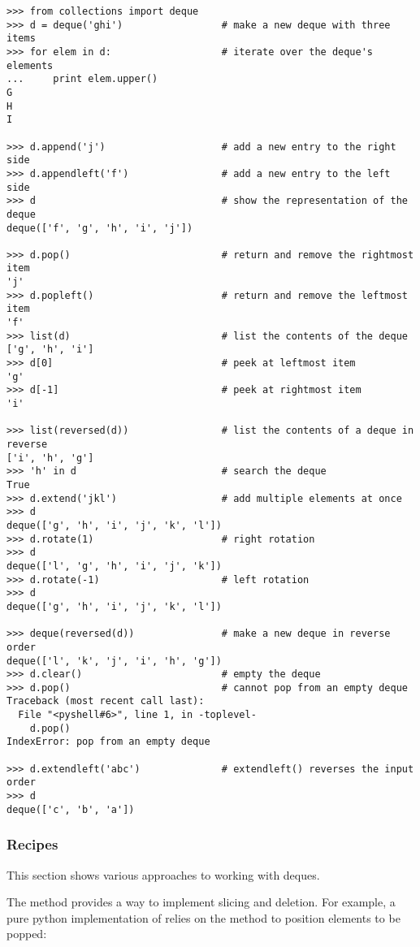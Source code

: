 \begin{verbatim}
>>> from collections import deque
>>> d = deque('ghi')                 # make a new deque with three items
>>> for elem in d:                   # iterate over the deque's elements
...     print elem.upper()	
G
H
I

>>> d.append('j')                    # add a new entry to the right side
>>> d.appendleft('f')                # add a new entry to the left side
>>> d                                # show the representation of the deque
deque(['f', 'g', 'h', 'i', 'j'])

>>> d.pop()                          # return and remove the rightmost item
'j'
>>> d.popleft()                      # return and remove the leftmost item
'f'
>>> list(d)                          # list the contents of the deque
['g', 'h', 'i']
>>> d[0]                             # peek at leftmost item
'g'
>>> d[-1]                            # peek at rightmost item
'i'

>>> list(reversed(d))                # list the contents of a deque in reverse
['i', 'h', 'g']
>>> 'h' in d                         # search the deque
True
>>> d.extend('jkl')                  # add multiple elements at once
>>> d
deque(['g', 'h', 'i', 'j', 'k', 'l'])
>>> d.rotate(1)                      # right rotation
>>> d
deque(['l', 'g', 'h', 'i', 'j', 'k'])
>>> d.rotate(-1)                     # left rotation
>>> d
deque(['g', 'h', 'i', 'j', 'k', 'l'])

>>> deque(reversed(d))               # make a new deque in reverse order
deque(['l', 'k', 'j', 'i', 'h', 'g'])
>>> d.clear()                        # empty the deque
>>> d.pop()                          # cannot pop from an empty deque
Traceback (most recent call last):
  File "<pyshell#6>", line 1, in -toplevel-
    d.pop()
IndexError: pop from an empty deque

>>> d.extendleft('abc')              # extendleft() reverses the input order
>>> d
deque(['c', 'b', 'a'])
\end{verbatim}

\subsubsection{Recipes \label{deque-recipes}}

This section shows various approaches to working with deques.

The  method provides a way to implement 
slicing and deletion.  For example, a pure python implementation of
 relies on the  method to position
elements to be popped:
    
